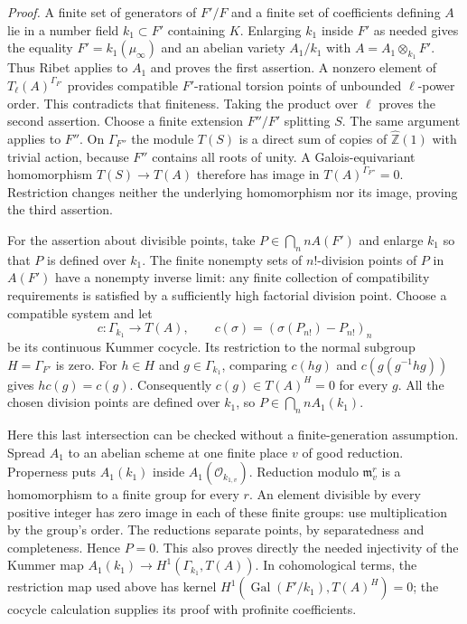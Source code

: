 \documentclass[11pt,a4paper]{article}
\begin{document}
\emph{Proof.} A finite set of generators of $F'/F$ and a finite set of coefficients defining $A$ lie in a number field $k_1\subset F'$ containing $K$. Enlarging $k_1$ inside $F'$ as needed gives the equality $F'=k_1(\mu_\infty)$ and an abelian variety $A_1/k_1$ with $A=A_1\otimes_{k_1}F'$. Thus Ribet applies to $A_1$ and proves the first assertion. A nonzero element of $T_\ell(A)^{\Gamma_{F'}}$ provides compatible $F'$-rational torsion points of unbounded $\ell$-power order. This contradicts that finiteness. Taking the product over $\ell$ proves the second assertion. Choose a finite extension $F''/F'$ splitting $S$. The same argument applies to $F''$. On $\Gamma_{F''}$ the module $T(S)$ is a direct sum of copies of $\widehat{\mathbb Z}(1)$ with trivial action, because $F''$ contains all roots of unity. A Galois-equivariant homomorphism $T(S)\to T(A)$ therefore has image in $T(A)^{\Gamma_{F''}}=0$. Restriction changes neither the underlying homomorphism nor its image, proving the third assertion.

For the assertion about divisible points, take $P\in\bigcap_n nA(F')$ and enlarge $k_1$ so that $P$ is defined over $k_1$. The finite nonempty sets of $n!$-division points of $P$ in $A(F')$ have a nonempty inverse limit: any finite collection of compatibility requirements is satisfied by a sufficiently high factorial division point. Choose a compatible system and let
\[
 c:\Gamma_{k_1}\longrightarrow T(A),\qquad
 c(\sigma)=(\sigma(P_{n!})-P_{n!})_n
\]
be its continuous Kummer cocycle. Its restriction to the normal subgroup $H=\Gamma_{F'}$ is zero. For $h\in H$ and $g\in\Gamma_{k_1}$, comparing $c(hg)$ and $c(g(g^{-1}hg))$ gives $h c(g)=c(g)$. Consequently $c(g)\in T(A)^H=0$ for every $g$. All the chosen division points are defined over $k_1$, so $P\in\bigcap_n nA_1(k_1)$.

Here this last intersection can be checked without a finite-generation assumption. Spread $A_1$ to an abelian scheme at one finite place $v$ of good reduction. Properness puts $A_1(k_1)$ inside $A_1(\mathcal O_{k_{1,v}})$. Reduction modulo $\mathfrak m_v^r$ is a homomorphism to a finite group for every $r$. An element divisible by every positive integer has zero image in each of these finite groups: use multiplication by the group's order. The reductions separate points, by separatedness and completeness. Hence $P=0$. This also proves directly the needed injectivity of the Kummer map $A_1(k_1)\to H^1(\Gamma_{k_1},T(A))$. In cohomological terms, the restriction map used above has kernel $H^1(\operatorname{Gal}(F'/k_1),T(A)^H)=0$; the cocycle calculation supplies its proof with profinite coefficients.
\end{document}
